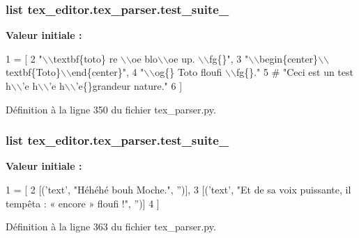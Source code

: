 \subsubsection[{test\+\_\+suite\+\_\+1}]{\setlength{\rightskip}{0pt plus 5cm}list tex\+\_\+editor.\+tex\+\_\+parser.\+test\+\_\+suite\+\_}\label{namespacetex__editor_1_1tex__parser_a9ca879b111fa4dbe32b476e800622f81}
{\bfseries Valeur initiale \+:}
\begin{DoxyCode}
1 = [
2         \textcolor{stringliteral}{"\(\backslash\)\(\backslash\)textbf\{toto\} re \(\backslash\)\(\backslash\)oe blo\(\backslash\)\(\backslash\)oe up. \(\backslash\)\(\backslash\)fg\{\}"},
3         \textcolor{stringliteral}{"\(\backslash\)\(\backslash\)begin\{center\}\(\backslash\)\(\backslash\)textbf\{Toto\}\(\backslash\)\(\backslash\)end\{center\}"},
4         \textcolor{stringliteral}{"\(\backslash\)\(\backslash\)og\{\} Toto floufi \(\backslash\)\(\backslash\)fg\{\}."}
5         \textcolor{comment}{# "Ceci est un test h\(\backslash\)\(\backslash\)'e h\(\backslash\)\(\backslash\)'e h\(\backslash\)\(\backslash\)'e\{\}grandeur nature."}
6     ]
\end{DoxyCode}


Définition à la ligne 350 du fichier tex\+\_\+parser.\+py.

\hypertarget{namespacetex__editor_1_1tex__parser_a5a98061bf500c69335751b0fc2cfc818}{}
\subsubsection[{test\+\_\+suite\+\_\+2}]{\setlength{\rightskip}{0pt plus 5cm}list tex\+\_\+editor.\+tex\+\_\+parser.\+test\+\_\+suite\+\_}\label{namespacetex__editor_1_1tex__parser_a5a98061bf500c69335751b0fc2cfc818}
{\bfseries Valeur initiale \+:}
\begin{DoxyCode}
1 = [
2         [(\textcolor{stringliteral}{'text'}, \textcolor{stringliteral}{"Héhéhé bouh Moche."}, \textcolor{stringliteral}{''})],
3         [(\textcolor{stringliteral}{'text'}, \textcolor{stringliteral}{"Et de sa voix puissante, il tempêta : « encore » floufi !"}, \textcolor{stringliteral}{''})]
4     ]
\end{DoxyCode}


Définition à la ligne 363 du fichier tex\+\_\+parser.\+py.

